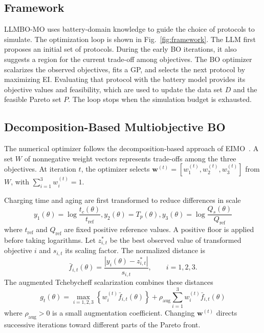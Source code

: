 \documentclass[journal,10pt]{IEEEtran}
\begin{document}
\subsection{Framework}
\label{sec:framework}

LLMBO-MO uses battery-domain knowledge to guide the choice of protocols to
simulate. The optimization loop is shown in Fig.~\ref{fig:framework}. The LLM
first proposes an initial set of protocols. During the early BO iterations,
it also suggests a region for the current trade-off among objectives. The BO
optimizer scalarizes the observed objectives, fits a GP, and selects the next
protocol by maximizing EI. Evaluating that protocol with the battery model
provides its objective values and feasibility, which are used to update the
data set $D$ and the feasible Pareto set $P$. The loop stops when the
simulation budget is exhausted.

\subsection{Decomposition-Based Multiobjective BO}
\label{sec:parego_backbone}

The numerical optimizer follows the decomposition-based approach of
EIMO~\cite{refEIMO}. A set $W$ of nonnegative weight vectors represents
trade-offs among the three objectives. At iteration $t$, the optimizer selects
$\mathbf w^{(t)}=[w_1^{(t)},w_2^{(t)},w_3^{(t)}]$ from $W$, with
$\sum_{i=1}^{3}w_i^{(t)}=1$.

Charging time and aging are first transformed to reduce differences in scale
\begin{equation}
 y_1(\theta)=\log\!\frac{t_c(\theta)}{t_{\mathrm{ref}}},
 y_2(\theta)=T_p(\theta),
 y_3(\theta)=\log\!\frac{Q_s(\theta)}{Q_{\mathrm{ref}}}
 \label{eq:objective_transform}
\end{equation}
where $t_{\mathrm{ref}}$ and $Q_{\mathrm{ref}}$ are fixed positive reference
values. A positive floor is applied before taking logarithms. Let
$z_{i,t}^{*}$ be the best observed value of transformed objective $i$ and
$s_{i,t}$ its scaling factor. The normalized distance is
\begin{equation}
 \bar f_{i,t}(\theta)=
 \frac{|y_i(\theta)-z_{i,t}^{*}|}{s_{i,t}},\qquad i=1,2,3.
 \label{eq:objective_scaling}
\end{equation}
The augmented Tchebycheff scalarization combines these distances
\begin{equation}
 g_t(\theta)=
 \max_{i=1,2,3}\!\left\{w_i^{(t)}\bar f_{i,t}(\theta)\right\}
 +\rho_{\mathrm{aug}}\sum_{i=1}^{3}w_i^{(t)}\bar f_{i,t}(\theta)
 \label{eq:tchebycheff}
\end{equation}
where $\rho_{\mathrm{aug}}>0$ is a small augmentation coefficient. Changing
$\mathbf w^{(t)}$ directs successive iterations toward different parts of the
Pareto front.
\end{document}
